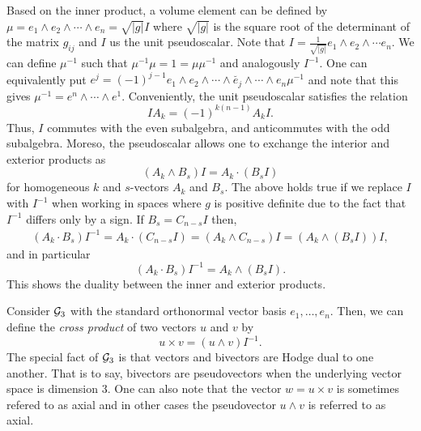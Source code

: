 \documentclass[12pt]{article}
\begin{document}
Based on the inner product, a volume element can be defined by $\mu=e_1 \wedge e_2 \wedge \cdots \wedge e_n = \sqrt{|g|} I$ where $\sqrt{|g|}$ is the square root of the determinant of the matrix $g_{ij}$ and $I$ us the unit pseudoscalar. Note that $I=\frac{1}{\sqrt{|g|}} e_1 \wedge e_2 \wedge \cdots e_n$. We can define $\mu^{-1}$ such that $\mu^{-1}\mu = 1 = \mu \mu^{-1}$ and analogously $I^{-1}$.  One can equivalently put $e^j = (-1)^{j-1} e_1 \wedge e_2 \wedge \cdots \wedge \breve{e_j} \wedge \cdots \wedge e_n \mu^{-1}$ and note that this gives $\mu^{-1} = e^n \wedge \cdots \wedge e^1$.  Conveniently, the unit pseudoscalar satisfies the relation
\[
IA_k = (-1)^{k(n-1)} A_k I.
\]
Thus, $I$ commutes with the even subalgebra, and anticommutes with the odd subalgebra.  Moreso, the pseudoscalar allows one to exchange the interior and exterior products as
\begin{equation}
\label{eq:wedge_to_dot}
 (A_k \wedge B_s) I = A_k \cdot (B_s I)
\end{equation}
for homogeneous $k$ and $s$-vectors $A_k$ and $B_s$. The above holds true if we replace $I$ with $I^{-1}$ when working in spaces where $g$ is positive definite due to the fact that $I^{-1}$ differs only by a sign. If $B_s = C_{n-s}I$ then,
\begin{align*}
 (A_k \cdot B_s)I^{-1} = A_k \cdot (C_{n-s}I) = (A_k \wedge C_{n-s})I = (A_k \wedge (B_sI))I,
\end{align*}
and in particular
\begin{equation}
\label{eq:dot_to_wedge}
    (A_k \cdot B_s)I^{-1} = A_k \wedge (B_s I).
\end{equation}
This shows the duality between the inner and exterior products.



\begin{example}
Consider $\mathcal{G}_3$ with the standard orthonormal vector basis $e_1,\dots,e_n$.  Then, we can define the \emph{cross product} of two vectors $u$ and $v$ by
\[
u \times v = (u\wedge v)I^{-1}.
\]
The special fact of $\mathcal{G}_3$ is that vectors and bivectors are Hodge dual to one another. That is to say, bivectors are pseudovectors when the underlying vector space is dimension 3. One can also note that the vector $w=u\times v$ is sometimes refered to as axial and in other cases the pseudovector $u\wedge v$ is referred to as axial.  
\end{example}
\end{document}

